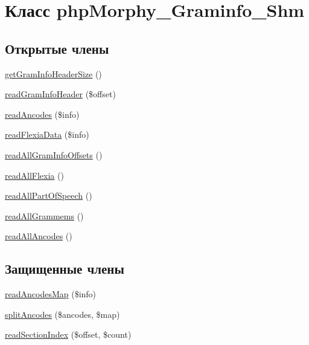 \hypertarget{classphpMorphy__Graminfo__Shm}{
\section{Класс phpMorphy\_\-Graminfo\_\-Shm}
\label{classphpMorphy__Graminfo__Shm}
}
\subsection*{Открытые члены}
\begin{DoxyCompactItemize}
\item 
\hyperlink{classphpMorphy__Graminfo__Shm_a39ac6a7853078aa54d35683e3bcedb8e}{getGramInfoHeaderSize} ()
\item 
\hyperlink{classphpMorphy__Graminfo__Shm_aa6d9be033a5d1f083c78580571624f39}{readGramInfoHeader} (\$offset)
\item 
\hyperlink{classphpMorphy__Graminfo__Shm_a7fc6f8b0e17cb40679e4c95aaa3fbf20}{readAncodes} (\$info)
\item 
\hyperlink{classphpMorphy__Graminfo__Shm_a0d5c9cd913526b8d41e6ae657ee56871}{readFlexiaData} (\$info)
\item 
\hyperlink{classphpMorphy__Graminfo__Shm_a5fa51c838458e2b385141da9bcc92741}{readAllGramInfoOffsets} ()
\item 
\hyperlink{classphpMorphy__Graminfo__Shm_a4ef9331148087be74036b2bc6d3e551d}{readAllFlexia} ()
\item 
\hyperlink{classphpMorphy__Graminfo__Shm_a721ac948fdd67faa48e61c89abcc2d41}{readAllPartOfSpeech} ()
\item 
\hyperlink{classphpMorphy__Graminfo__Shm_ac2c4d93b62dde29b90cf360bba9a647c}{readAllGrammems} ()
\item 
\hyperlink{classphpMorphy__Graminfo__Shm_aa5107f502730b869d0c69c7e29072b2a}{readAllAncodes} ()
\end{DoxyCompactItemize}
\subsection*{Защищенные члены}
\begin{DoxyCompactItemize}
\item 
\hyperlink{classphpMorphy__Graminfo__Shm_af51655834d1ca979f6e273298335ac86}{readAncodesMap} (\$info)
\item 
\hyperlink{classphpMorphy__Graminfo__Shm_a76ca1fef5fd3652daf4b7657cf330d21}{splitAncodes} (\$ancodes, \$map)
\item 
\hyperlink{classphpMorphy__Graminfo__Shm_af6aea0dfc7105ab2045eb155361dedf3}{readSectionIndex} (\$offset, \$count)
\end{DoxyCompactItemize}


